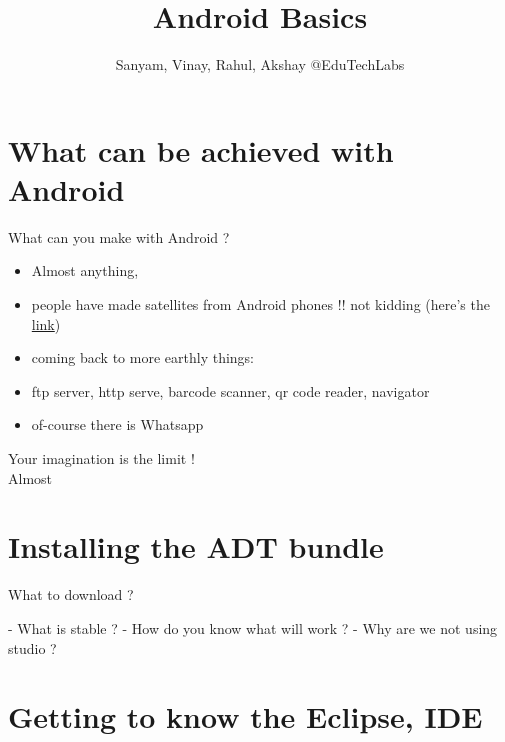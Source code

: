 \documentclass[11pt]{beamer}
\author{Sanyam, Vinay, Rahul, Akshay @EduTechLabs}
\title{Android Basics}
\begin{document}
\begin{frame}
\titlepage
\end{frame}


\section{What can be achieved with Android}

\begin{frame}[containsverbatim]{What can you make with Android ?}

	\begin{flushleft}
		\begin{itemize}			
		\item Almost anything,
		\item people have made satellites from Android phones !! not kidding (here's the \href{http://www.theverge.com/2013/5/3/4297718/nasa-phonesat-android-nexus-returns-images}{link})
		\item coming back to more earthly things:
		\item ftp server, http serve, barcode scanner, qr code reader, navigator 
		\item of-course there is Whatsapp
		\end{itemize}	
	\end{flushleft}

\huge Your imagination is the limit ! \\

\normalsize Almost 
\end{frame}


\section{Installing the ADT bundle}

\begin{frame}[containsverbatim]{What to download ?}
	\begin{flushleft}
		 - What is stable ?
		 - How do you know what will work ?
		 - Why are we not using studio ?
	\end{flushleft}
\end{frame}

\section{Getting to know the Eclipse, IDE}
\end{document}
